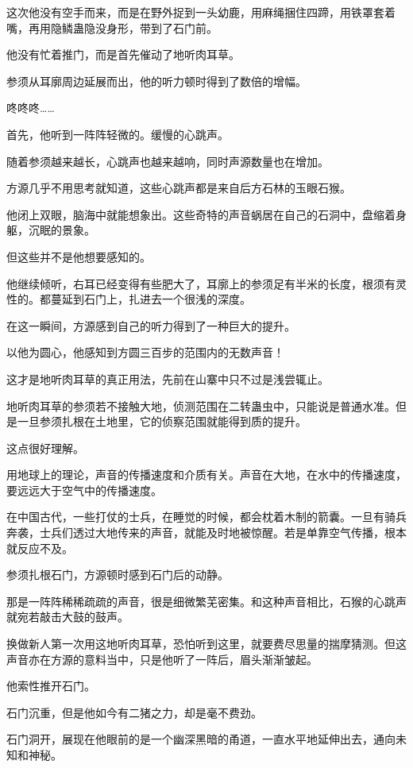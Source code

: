 \begin{this_body}
这次他没有空手而来，而是在野外捉到一头幼鹿，用麻绳捆住四蹄，用铁罩套着嘴，再用隐鳞蛊隐没身形，带到了石门前。

他没有忙着推门，而是首先催动了地听肉耳草。

参须从耳廓周边延展而出，他的听力顿时得到了数倍的增幅。

咚咚咚……

首先，他听到一阵阵轻微的。缓慢的心跳声。

随着参须越来越长，心跳声也越来越响，同时声源数量也在增加。

方源几乎不用思考就知道，这些心跳声都是来自后方石林的玉眼石猴。

他闭上双眼，脑海中就能想象出。这些奇特的声音蜗居在自己的石洞中，盘缩着身躯，沉眠的景象。

但这些并不是他想要感知的。

他继续倾听，右耳已经变得有些肥大了，耳廓上的参须足有半米的长度，根须有灵性的。都蔓延到石门上，扎进去一个很浅的深度。

在这一瞬间，方源感到自己的听力得到了一种巨大的提升。

以他为圆心，他感知到方圆三百步的范围内的无数声音！

这才是地听肉耳草的真正用法，先前在山寨中只不过是浅尝辄止。

地听肉耳草的参须若不接触大地，侦测范围在二转蛊虫中，只能说是普通水准。但是一旦参须扎根在土地里，它的侦察范围就能得到质的提升。

这点很好理解。

用地球上的理论，声音的传播速度和介质有关。声音在大地，在水中的传播速度，要远远大于空气中的传播速度。

在中国古代，一些打仗的士兵，在睡觉的时候，都会枕着木制的箭囊。一旦有骑兵奔袭，士兵们透过大地传来的声音，就能及时地被惊醒。若是单靠空气传播，根本就反应不及。

参须扎根石门，方源顿时感到石门后的动静。

那是一阵阵稀稀疏疏的声音，很是细微繁芜密集。和这种声音相比，石猴的心跳声就宛若敲击大鼓的鼓声。

换做新人第一次用这地听肉耳草，恐怕听到这里，就要费尽思量的揣摩猜测。但这声音亦在方源的意料当中，只是他听了一阵后，眉头渐渐皱起。

他索性推开石门。

石门沉重，但是他如今有二猪之力，却是毫不费劲。

石门洞开，展现在他眼前的是一个幽深黑暗的甬道，一直水平地延伸出去，通向未知和神秘。


\end{this_body}
